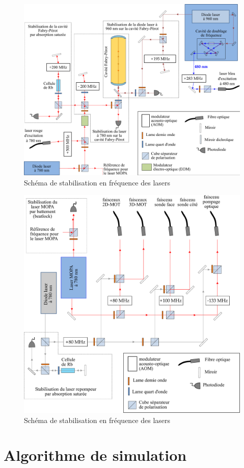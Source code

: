 \documentclass[11pt,a4paper,twoside]{book}
\begin{document}
\begin{figure}[h]
\centering
\includegraphics[width=\linewidth]{figures/apx/stabil_laser_1}
\caption[Schéma de stabilisation en fréquence des lasers]
{
Schéma de stabilisation en fréquence des lasers
}
\label{fig:laserlock1}
\end{figure}

\begin{figure}[h]
\centering
\includegraphics[width=\linewidth]{figures/apx/stabil_laser_2}
\caption[Schéma de stabilisation en fréquence des lasers]
{
Schéma de stabilisation en fréquence des lasers
}
\label{fig:laserlock2}
\end{figure}

\chapter{Algorithme de simulation}\label{app:algo}
\renewcommand{\bibname}{References}
\printbibliography

\backmatter
\end{document}
